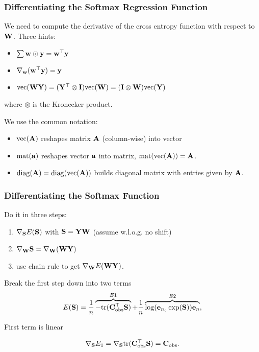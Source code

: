 \documentclass[12pt,fleqn,handout]{beamer}
\begin{document}
\begin{frame}\frametitle{Differentiating the Softmax Regression Function}

We need to compute the derivative of the cross entropy function with respect to ${\bf W}$.
Three hints:
\begin{itemize}
\item $\sum {\bf w} \odot {\bf y} = {\bf w}^{\top} {\bf y} $
\item $\nabla_{{\bf w}} ({\bf w}^{\top} {\bf y}) = {\bf y}$
\item ${\rm vec} ({\bf W} {\bf Y}) = ({\bf Y}^\top \otimes {\bf I}) {\rm vec} ({\bf W}) = ({\bf I} \otimes {\bf W}) {\rm vec}({\bf Y})$
\end{itemize}
where $\otimes$ is the Kronecker product.

\bigskip



We use the common notation:
\begin{itemize}
	\item ${\rm vec}({\bf A})$ reshapes matrix ${\bf A}$ (column-wise) into vector
	\item ${\rm mat}({\bf a})$ reshapes vector ${\bf a}$ into matrix, ${\rm mat}({\rm vec}({\bf A})) = {\bf A}$.
	\item ${\rm diag}({\bf A}) = {\rm diag}({\rm vec}( {\bf A}))$ builds diagonal matrix with entries given by ${\bf A}$. 
\end{itemize}


\end{frame}

\begin{frame}[fragile]\frametitle{Differentiating the Softmax Function}

Do it in three steps:
\begin{enumerate}
	\item $\nabla_{{\bf S}} E({\bf S})$ with ${\bf S} = {\bf Y} {\bf W}$ (assume w.l.o.g. no shift)
	\item $\nabla_{{\bf W}} {\bf S} = \nabla_{{\bf W}} ({\bf W} {\bf Y})$
	\item use chain rule to get $\nabla_{{\bf W}} E({\bf W}{\bf Y})$.
\end{enumerate}

\bigskip
\pause

Break the first step down into two terms
$$ E({\bf S}) = \frac{1}{n} \overbrace{-{\rm tr}({\bf C}_{\rm obs}^{\top} {\bf S})}^{E1} + \frac{1}{n} \overbrace{\log({\bf e}_{n_c}\exp({\bf S})){\bf e}_n}^{E2}, $$


\bigskip
\pause

First term is linear

$$\nabla_{{\bf S}}E_1 =  \nabla_{{\bf S}} {\rm tr}({\bf C}_{\rm obs}^{\top} {\bf S}) = {\bf C}_{\rm obs}. $$

\end{frame}
\end{document}
